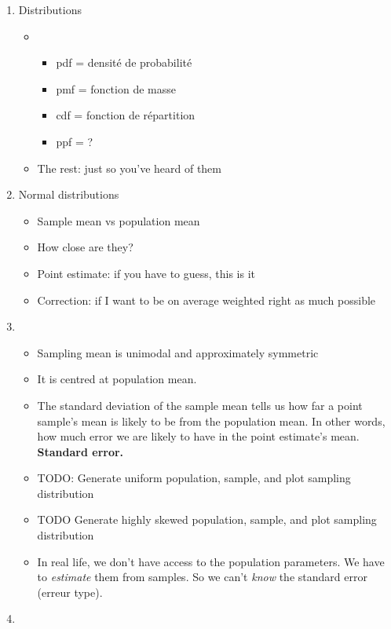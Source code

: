 \begin{enumerate}
\item Distributions
  \begin{itemize}
  \item {}
    \begin{itemize}
    \item pdf = densité de probabilité
    \item pmf = fonction de masse
    \item cdf = fonction de répartition
    \item ppf = ?
    \end{itemize}
  \item The rest: just so you've heard of them
  \end{itemize}
\item Normal distributions
  \begin{itemize}
  \item Sample mean vs population mean
  \item How close are they?
  \item Point estimate: if you have to guess, this is it
  \item Correction: if I want to be on average weighted right as much possible
  \end{itemize}
\item {}
  \begin{itemize}
  \item Sampling mean is unimodal and approximately symmetric
  \item It is centred at population mean.
    \item The standard deviation of the sample mean tells us how far a
      point sample's mean is likely to be from the population mean.
      In other words, how much error we are likely to have in the
      point estimate's mean.  \textbf{Standard error.}
    \item TODO: Generate uniform population, sample,
      and plot sampling distribution
    \item TODO Generate highly skewed population, sample, and plot
      sampling distribution
    \item In real life, we don't have access to the population
      parameters.  We have to \textit{estimate} them from samples.  So
      we can't \textit{know} the standard error (erreur type).
  \end{itemize}
\item {}

\end{enumerate}
